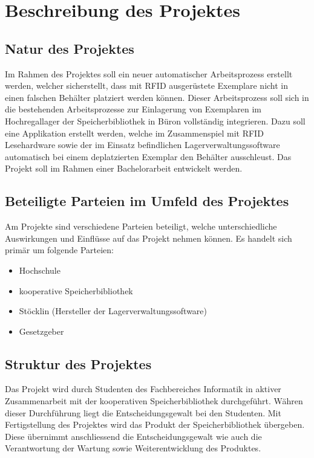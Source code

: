 \chapter{Beschreibung des Projektes}

\section{Natur des Projektes}
Im Rahmen des Projektes soll ein neuer automatischer Arbeitsprozess erstellt werden, welcher sicherstellt, dass mit RFID ausgerüstete Exemplare nicht in einen falschen Behälter platziert werden können. Dieser Arbeitsprozess soll sich in die bestehenden Arbeitsprozesse zur Einlagerung von Exemplaren im Hochregallager der Speicherbibliothek in Büron vollständig integrieren. Dazu soll eine Applikation erstellt werden, welche im Zusammenspiel mit RFID Lesehardware sowie der im Einsatz befindlichen Lagerverwaltungssoftware automatisch bei einem deplatzierten Exemplar den Behälter ausschleust. Das Projekt soll im Rahmen einer Bachelorarbeit entwickelt werden.

\section{Beteiligte Parteien im Umfeld des Projektes}
Am Projekte sind verschiedene Parteien beteiligt, welche unterschiedliche Auswirkungen und Einflüsse auf das Projekt nehmen können. Es handelt sich primär um folgende Parteien:
\begin{itemize}
	\item Hochschule
	\item kooperative Speicherbibliothek
	\item Stöcklin (Hersteller der Lagerverwaltungssoftware)
	\item Gesetzgeber
\end{itemize}

\section{Struktur des Projektes}
Das Projekt wird durch Studenten des Fachbereiches Informatik in aktiver Zusammenarbeit mit der kooperativen Speicherbibliothek durchgeführt. Währen dieser Durchführung liegt die Entscheidungsgewalt bei den Studenten. Mit Fertigstellung des Projektes wird das Produkt der Speicherbibliothek übergeben. Diese übernimmt anschliessend die Entscheidungsgewalt wie auch die Verantwortung der Wartung sowie Weiterentwicklung des Produktes.

